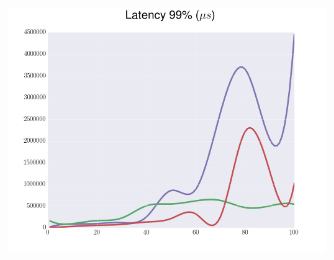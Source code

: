 \documentclass[usenames,dvipsnames, 18pt, compress, aspectratio=169]{beamer}
\begin{document}
\begin{frame}
    \frametitle{}
    \begin{center}
    \begin{figure}
        \includegraphics[width=0.75\textwidth,center]{benchmarks/workload_a_large_document/latency_99.png}
    \end{figure}
    \end{center}
\end{frame}




\end{document}
